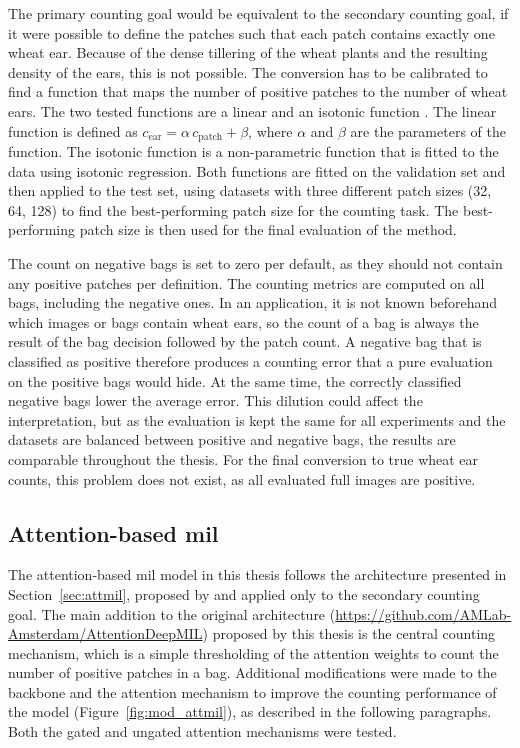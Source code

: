 \documentclass[12pt,parskip = half, DIV=classic,listof=totoc]{scrartcl}
\begin{document}
			The primary counting goal would be equivalent to the secondary counting goal, if it were possible to define the patches 
			such that each patch contains exactly one wheat ear.
			Because of the dense tillering of the wheat plants and the resulting density of the ears, this is not possible.
			The conversion has to be calibrated to find a function that maps the number of positive patches to the number of wheat ears. The two
			tested functions are a linear and an isotonic function \cite{isotonic}. The linear function is defined as $c_{\text{ear}} = \alpha\,c_{\text{patch}} + \beta$, where 
			$\alpha$ and $\beta$ are the parameters of the function. The isotonic function is a non-parametric function that is fitted to the data 
			using isotonic regression. Both functions are fitted on the validation set and then applied to the test set, using datasets with three
			different patch sizes (32, 64, 128) to find the best-performing patch size for the counting task. The best-performing patch size is 
			then used for the final evaluation of the method.

			The count on negative bags is set to zero per default, as they should not contain any positive patches per definition. 
			The counting metrics are computed on all bags, including the negative ones. In an application, it is not known beforehand which 
			images or bags contain wheat ears, so the count of a bag is always the result of the bag decision followed by the patch count. 
			A negative bag that is classified as positive therefore produces a counting error that a pure evaluation on the positive 
			bags would hide. At the same time, the correctly classified negative bags lower the average error. 
			This dilution could affect the interpretation, but as the evaluation is kept the same for all experiments and the datasets are balanced between 
			positive and negative bags, the results are comparable throughout the thesis. For the final conversion to true wheat ear counts, this problem
			does not exist, as all evaluated full images are positive.

		\subsection{Attention-based \acs*{mil}}\label{sec:method_attmil}
				The attention-based \ac{mil} model in this thesis follows the architecture presented in Section~\ref{sec:attmil}, proposed by 
				\textcite{ilseAttentionbasedDeepMultiple2018} and applied only to the secondary counting goal. The main addition to the 
				original architecture (\url{https://github.com/AMLab-Amsterdam/AttentionDeepMIL}) proposed by this thesis is the central counting mechanism, which
				is a simple thresholding of the attention weights to count 
				the number of positive patches in a bag. Additional modifications were made to the backbone and the attention mechanism to 
				improve the counting performance of the model (Figure~\ref{fig:mod_attmil}), as described in the following paragraphs. 
				Both the gated and ungated attention mechanisms were tested.
\end{document}
